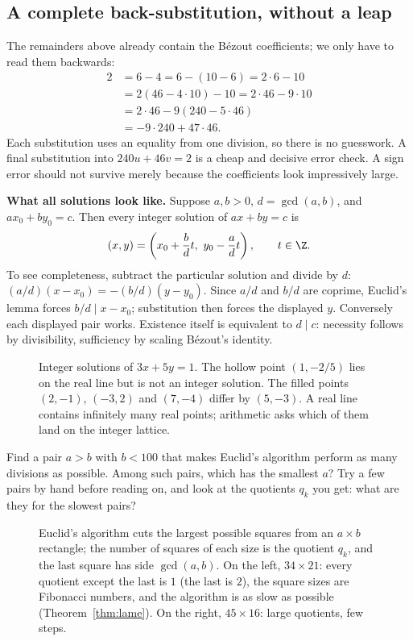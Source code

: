 \subsection*{A complete back-substitution, without a leap}
The remainders above already contain the B\'ezout coefficients; we only have to read them backwards:
\[
\begin{aligned}
2&=6-4=6-(10-6)=2\cdot6-10\\
 &=2(46-4\cdot10)-10=2\cdot46-9\cdot10\\
 &=2\cdot46-9(240-5\cdot46)\\
 &=-9\cdot240+47\cdot46.
\end{aligned}
\]
Each substitution uses an equality from one division, so there is no guesswork. A final substitution into $240u+46v=2$ is a cheap and decisive error check. A sign error should not survive merely because the coefficients look impressively large.

\textbf{What all solutions look like.} Suppose $a,b>0$, $d=\gcd(a,b)$, and $ax_0+by_0=c$. Then every integer solution of $ax+by=c$ is
\[
(x,y)=\left(x_0+\frac bd t,\ y_0-\frac ad t\right),\qquad t\in\Z.
\]
To see completeness, subtract the particular solution and divide by $d$: $(a/d)(x-x_0)=-(b/d)(y-y_0)$. Since $a/d$ and $b/d$ are coprime, Euclid's lemma forces $b/d\mid x-x_0$; substitution then forces the displayed $y$. Conversely each displayed pair works. Existence itself is equivalent to $d\mid c$: necessity follows by divisibility, sufficiency by scaling B\'ezout's identity.

\begin{figure}[ht]
\centering{}
\caption{Integer solutions of $3x+5y=1$. The hollow point $(1,-2/5)$ lies on the real line but is not an integer solution. The filled points $(2,-1)$, $(-3,2)$ and $(7,-4)$ differ by $(5,-3)$. A real line contains infinitely many real points; arithmetic asks which of them land on the integer lattice.}
\label{fig:bezout-line}
\end{figure}

\begin{think}
Find a pair $a>b$ with $b<100$ that makes Euclid's algorithm perform as many divisions as possible. Among such pairs, which has the smallest $a$? Try a few pairs by hand before reading on, and look at the quotients $q_k$ you get: what are they for the slowest pairs?
\end{think}

\begin{figure}[ht]
\centering
{}
\caption{Euclid's algorithm cuts the largest possible squares from an $a\times b$ rectangle; the number of squares of each size is the quotient $q_k$, and the last square has side $\gcd(a,b)$. On the left, $34\times21$: every quotient except the last is $1$ (the last is $2$), the square sizes are Fibonacci numbers, and the algorithm is as slow as possible (Theorem~\ref{thm:lame}). On the right, $45\times16$: large quotients, few steps.}
\label{fig:euclid}
\end{figure}

